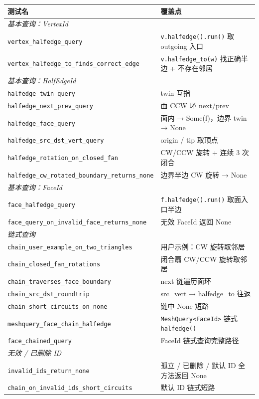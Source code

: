 \documentclass[11pt,a4paper]{article}
\begin{document}
\begin{center}
\scriptsize
\renewcommand{\arraystretch}{1.18}
\begin{tabular}{@{}ll@{}}
  \toprule
  \textbf{测试名} & \textbf{覆盖点} \\
  \midrule
  \multicolumn{2}{l}{\textit{基本查询：VertexId}} \\
  \texttt{vertex\_halfedge\_query}              & \texttt{v.halfedge().run()} 取 outgoing 入口 \\
  \texttt{vertex\_halfedge\_to\_finds\_correct\_edge} & \texttt{v.halfedge\_to(w)} 找正确半边 + 不存在邻居 \\
  \midrule
  \multicolumn{2}{l}{\textit{基本查询：HalfEdgeId}} \\
  \texttt{halfedge\_twin\_query}                & twin 互指 \\
  \texttt{halfedge\_next\_prev\_query}          & 面 CCW 环 next/prev \\
  \texttt{halfedge\_face\_query}                & 面内 → Some(f)，边界 twin → None \\
  \texttt{halfedge\_src\_dst\_vert\_query}      & origin / tip 取顶点 \\
  \texttt{halfedge\_rotation\_on\_closed\_fan}  & CW/CCW 旋转 + 连续 3 次闭合 \\
  \texttt{halfedge\_cw\_rotated\_boundary\_returns\_none} & 边界半边 CW 旋转 → None \\
  \midrule
  \multicolumn{2}{l}{\textit{基本查询：FaceId}} \\
  \texttt{face\_halfedge\_query}                & \texttt{f.halfedge().run()} 取面入口半边 \\
  \texttt{face\_query\_on\_invalid\_face\_returns\_none} & 无效 FaceId 返回 None \\
  \midrule
  \multicolumn{2}{l}{\textit{链式查询}} \\
  \texttt{chain\_user\_example\_on\_two\_triangles} & 用户示例：CW 旋转取邻居 \\
  \texttt{chain\_closed\_fan\_rotations}        & 闭合扇 CW/CCW 旋转取邻居 \\
  \texttt{chain\_traverses\_face\_boundary}     & next 链遍历面环 \\
  \texttt{chain\_src\_dst\_roundtrip}           & src\_vert → halfedge\_to 往返 \\
  \texttt{chain\_short\_circuits\_on\_none}     & 链中 None 短路 \\
  \texttt{meshquery\_face\_chain\_halfedge}     & \texttt{MeshQuery<FaceId>} 链式 \texttt{halfedge()} \\
  \texttt{face\_chained\_query}                 & FaceId 链式查询完整路径 \\
  \midrule
  \multicolumn{2}{l}{\textit{无效 / 已删除 ID}} \\
  \texttt{invalid\_ids\_return\_none}           & 孤立 / 已删除 / 默认 ID 全方法返回 None \\
  \texttt{chain\_on\_invalid\_ids\_short\_circuits} & 默认 ID 链式短路 \\
  \bottomrule
\end{tabular}
\end{center}
\end{document}
